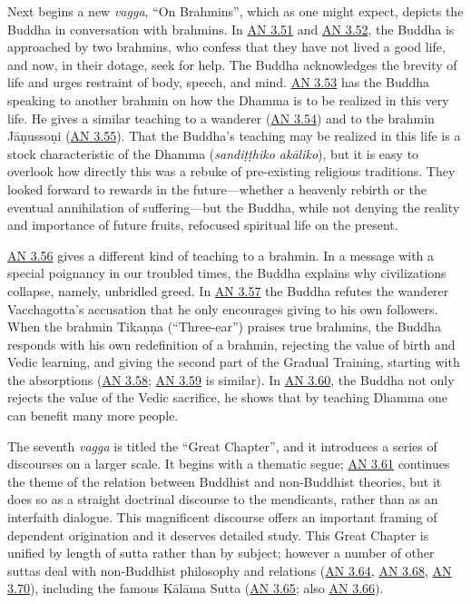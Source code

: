 \documentclass[12pt,openany]{book}%
\begin{document}
Next begins a new \textit{vagga}, “On Brahmins”, which as one might expect, depicts the Buddha in conversation with brahmins. In \href{https://suttacentral.net/an3.51}{AN 3.51} and \href{https://suttacentral.net/an3.52}{AN 3.52}, the Buddha is approached by two brahmins, who confess that they have not lived a good life, and now, in their dotage, seek for help. The Buddha acknowledges the brevity of life and urges restraint of body, speech, and mind. \href{https://suttacentral.net/an3.53}{AN 3.53} has the Buddha speaking to another brahmin on how the Dhamma is to be realized in this very life. He gives a similar teaching to a wanderer (\href{https://suttacentral.net/an3.54}{AN 3.54}) and to the brahmin \textsanskrit{Jāṇussoṇi} (\href{https://suttacentral.net/an3.55}{AN 3.55}). That the Buddha’s teaching may be realized in this life is a stock characteristic of the Dhamma (\textit{\textsanskrit{sandiṭṭhiko} \textsanskrit{akāliko}}), but it is easy to overlook how directly this was a rebuke of pre-existing religious traditions. They looked forward to rewards in the future—whether a heavenly rebirth or the eventual annihilation of suffering—but the Buddha, while not denying the reality and importance of future fruits, refocused spiritual life on the present.

\href{https://suttacentral.net/an3.56}{AN 3.56} gives a different kind of teaching to a brahmin. In a message with a special poignancy in our troubled times, the Buddha explains why civilizations collapse, namely, unbridled greed. In \href{https://suttacentral.net/an3.57}{AN 3.57} the Buddha refutes the wanderer Vacchagotta’s accusation that he only encourages giving to his own followers. When the brahmin \textsanskrit{Tikaṇṇa} (“Three-ear”) praises true brahmins, the Buddha responds with his own redefinition of a brahmin, rejecting the value of birth and Vedic learning, and giving the second part of the Gradual Training, starting with the absorptions (\href{https://suttacentral.net/an3.58}{AN 3.58}; \href{https://suttacentral.net/an3.59}{AN 3.59} is similar). In \href{https://suttacentral.net/an3.60}{AN 3.60}, the Buddha not only rejects the value of the Vedic sacrifice, he shows that by teaching Dhamma one can benefit many more people.

The seventh \textit{vagga} is titled the “Great Chapter”, and it introduces a series of discourses on a larger scale. It begins with a thematic segue; \href{https://suttacentral.net/an3.61}{AN 3.61} continues the theme of the relation between Buddhist and non-Buddhist theories, but it does so as a straight doctrinal discourse to the mendicants, rather than as an interfaith dialogue. This magnificent discourse offers an important framing of dependent origination and it deserves detailed study. This Great Chapter is unified by length of sutta rather than by subject; however a number of other suttas deal with non-Buddhist philosophy and relations (\href{https://suttacentral.net/an3.64}{AN 3.64}, \href{https://suttacentral.net/an3.68}{AN 3.68}, \href{https://suttacentral.net/an3.70}{AN 3.70}), including the famous \textsanskrit{Kālāma} Sutta (\href{https://suttacentral.net/an3.65}{AN 3.65}; also \href{https://suttacentral.net/an3.66}{AN 3.66}).
\end{document}

